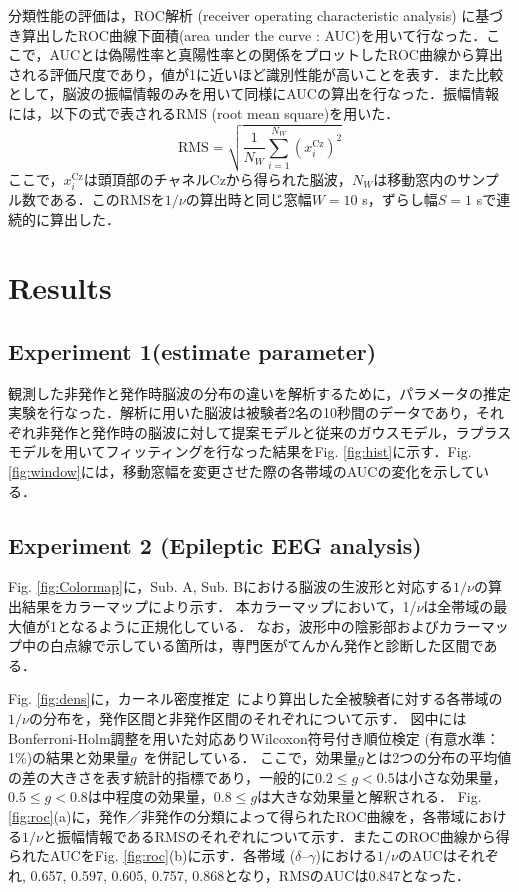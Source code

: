 \documentclass[journal]{IEEEtran}
\begin{document}
分類性能の評価は，ROC解析 (receiver operating characteristic analysis) に基づき算出したROC曲線下面積(area under the curve : AUC)を用いて行なった．ここで，AUCとは偽陽性率と真陽性率との関係をプロットしたROC曲線から算出される評価尺度であり，値が1に近いほど識別性能が高いことを表す．また比較として，脳波の振幅情報のみを用いて同様にAUCの算出を行なった．振幅情報には，以下の式で表されるRMS (root mean square)を用いた\cite{Hamedi2014}．
\begin{equation}%
		\mathrm{RMS} = \sqrt{\frac{1}{N_W} \sum_{i=1}^{N_W} (x_i^\mathrm{Cz})^2}
\end{equation}
ここで，$x_i^\mathrm{Cz}$は頭頂部のチャネルCzから得られた脳波，$N_W$は移動窓内のサンプル数である．このRMSを$1/\nu$の算出時と同じ窓幅$W = 10$ s，ずらし幅$S = 1$ sで連続的に算出した．

\section{Results}
\subsection{Experiment 1(estimate parameter)}
観測した非発作と発作時脳波の分布の違いを解析するために，パラメータの推定実験を行なった．解析に用いた脳波は被験者2名の10秒間のデータであり，それぞれ非発作と発作時の脳波に対して提案モデルと従来のガウスモデル，ラプラスモデルを用いてフィッティングを行なった結果をFig. \ref{fig:hist}に示す．Fig. \ref{fig:window}には，移動窓幅を変更させた際の各帯域のAUCの変化を示している．

\subsection{Experiment 2 (Epileptic EEG analysis)}
Fig. \ref{fig:Colormap}に，Sub. A, Sub. Bにおける脳波の生波形と対応する$1/\nu$の算出結果をカラーマップにより示す．
本カラーマップにおいて，1/$\nu$は全帯域の最大値が1となるように正規化している．
なお，波形中の陰影部およびカラーマップ中の白点線で示している箇所は，専門医がてんかん発作と診断した区間である．

Fig. \ref{fig:dens}に，カーネル密度推定~\cite{Parzen1962}により算出した全被験者に対する各帯域の$1/\nu$の分布を，発作区間と非発作区間のそれぞれについて示す．
図中にはBonferroni-Holm調整を用いた対応ありWilcoxon符号付き順位検定 (有意水準：1\%)の結果と効果量$g$~\cite{Hedges1981}を併記している．
ここで，効果量$g$とは2つの分布の平均値の差の大きさを表す統計的指標であり，一般的に$0.2 \leq g < 0.5$は小さな効果量，$0.5 \leq g < 0.8$は中程度の効果量，$0.8 \leq g$は大きな効果量と解釈される．
Fig. \ref{fig:roc}(a)に，発作／非発作の分類によって得られたROC曲線を，各帯域における$1/\nu$と振幅情報であるRMSのそれぞれについて示す．またこのROC曲線から得られたAUCをFig. \ref{fig:roc}(b)に示す．各帯域 ($\delta$--$\gamma$)における$1/\nu$のAUCはそれぞれ, 0.657, 0.597, 0.605, 0.757, 0.868となり，RMSのAUCは0.847となった．
\end{document}
